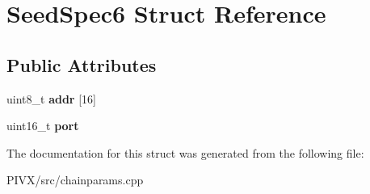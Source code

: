 \hypertarget{struct_seed_spec6}{}\section{Seed\+Spec6 Struct Reference}
\label{struct_seed_spec6}
\subsection*{Public Attributes}
\begin{DoxyCompactItemize}
\item 
\mbox{\label{struct_seed_spec6_ad08d58f6fcd19c2bdb1e24cde0791cbc}} 
uint8\+\_\+t {\bfseries addr} \mbox{[}16\mbox{]}
\item 
\mbox{\label{struct_seed_spec6_a48fdfc3ed14e7676b500bab2e2bcc643}} 
uint16\+\_\+t {\bfseries port}
\end{DoxyCompactItemize}


The documentation for this struct was generated from the following file\+:\begin{DoxyCompactItemize}
\item 
P\+I\+V\+X/src/chainparams.\+cpp\end{DoxyCompactItemize}
